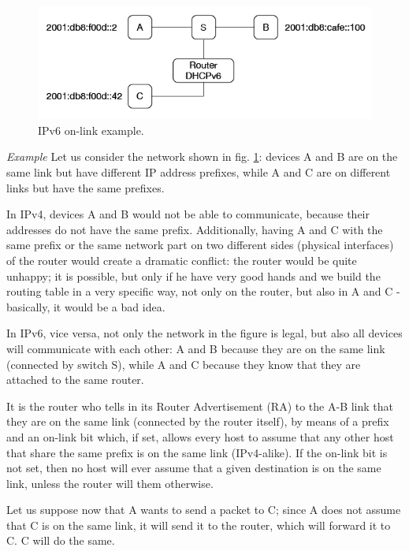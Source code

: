 \vspace{0.5em}

\begin{figure}[h]
    \centering
    \includegraphics[scale=0.7]{img/neighbors_example.png}
    \decoRule
    \caption{IPv6 on-link example.}
    \label{fig:neighbors_example}
\end{figure}

\emph{Example} Let us consider the network shown in fig. \ref{fig:neighbors_example}: devices A and B are on the same link but have different IP address prefixes, while A and C are on different links but have the same prefixes.

In IPv4, devices A and B would not be able to communicate, because their addresses do not have the same prefix. Additionally, having A and C with the same prefix or the same network part on two different sides (physical interfaces) of the router would create a dramatic conflict: the router would be quite unhappy; it is possible, but only if he have very good hands and we build the routing table in a very specific way, not only on the router, but also in A and C - basically, it would be a bad idea.

In IPv6, vice versa, not only the network in the figure is legal, but also all devices will communicate with each other: A and B because they are on the same link (connected by switch S), while A and C because they know that they are attached to the same router.

It is the router who tells in its Router Advertisement (RA) to the A-B link that they are on the same link (connected by the router itself), by means of a prefix and an on-link bit which, if set, allows every host to assume that any other host that share the same prefix is on the same link (IPv4-alike). If the on-link bit is not set, then no host will ever assume that a given destination is on the same link, unless the router will them otherwise.

Let us suppose now that A wants to send a packet to C; since A does not assume that C is on the same link, it will send it to the router, which will forward it to C. C will do the same.

